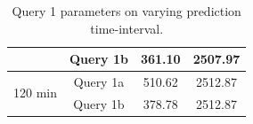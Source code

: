 \documentclass{sig-alternate}
\begin{document}
\begin{table}[!htbp]
\begin{tabular}{|c|c|c|c|}
                                                               & Query 1b & 361.10                                                             & 2507.97                                                       \\ \hline
\multirow{2}{*}{120 min}                                       & Query 1a & 510.62                                                             & 2512.87                                                       \\ \cline{2-4} 
                                                               & Query 1b & 378.78                                                             & 2512.87                                                       \\ \hline
\end{tabular}
 \caption{\label{table:q1-timeslice} Query 1 parameters on varying prediction time-interval.}
\end{table}
 

 
\end{document}
